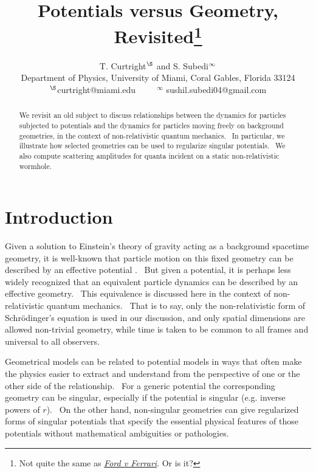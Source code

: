 \documentclass{article}%
\begin{document}
\title{Potentials versus Geometry, Revisited\thanks{Not quite the same as
\textit{\href{https://en.wikipedia.org/wiki/Ford_v_Ferrari}{Ford v Ferrari}}.
Or is it?}}
\author{T. Curtright$^{\S }$ and S. Subedi$^{\infty}\medskip$\\Department of Physics, University of Miami, Coral Gables, Florida 33124\\$^{\S }${\footnotesize curtright@miami.edu\ \ \ \ \ }$^{\infty}$%
{\footnotesize sushil.subedi04@gmail.com}}
\date{}
\maketitle

\begin{abstract}
We revisit an old subject to discuss relationships between the dynamics for
particles subjected to potentials and the dynamics for particles moving freely
on background geometries, in the context of non-relativistic quantum
mechanics. \ In particular, we illustrate how selected geometries can be used
to regularize singular potentials. \ We also compute scattering amplitudes for
quanta incident on a static non-relativistic wormhole.

\end{abstract}
\tableofcontents

\section{Introduction}

Given a solution to Einstein's theory of gravity acting as a background
spacetime geometry, it is well-known that particle motion on this fixed
geometry can be described by an effective potential \cite{MTW}. \ But given a
potential, it is perhaps less widely recognized that an equivalent particle
dynamics can be described by an effective geometry. \ This equivalence is
discussed here in the context of non-relativistic quantum mechanics. \ That is
to say, only the non-relativistic form of Schr\"{o}dinger's equation is used
in our discussion, and only spatial dimensions are allowed non-trivial
geometry, while time is taken to be common to all frames and universal to all observers.

Geometrical models can be related to potential models in ways that often make
the physics easier to extract and understand from the perspective of one or
the other side of the relationship. \ For a generic potential the
corresponding geometry can be singular, especially if the potential is
singular (e.g. inverse powers of $r$). \ On the other hand, non-singular
geometries can give regularized forms of singular potentials that specify the
essential physical features of those potentials without mathematical
ambiguities or pathologies.
\end{document}
